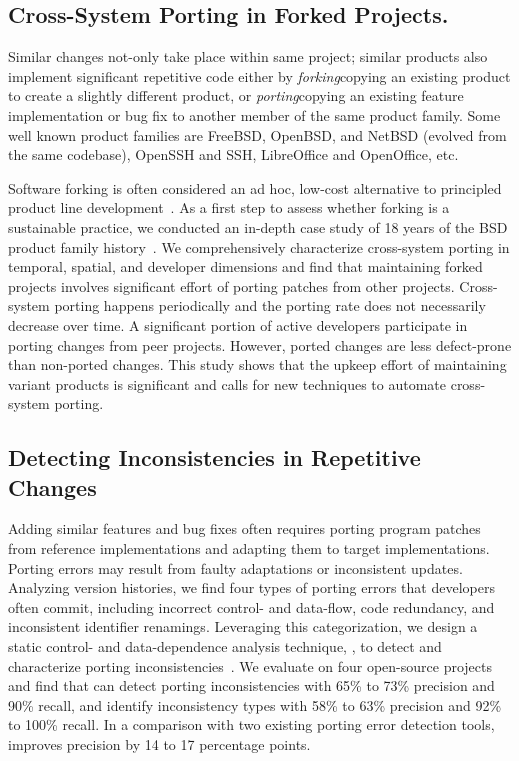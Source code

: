 \documentclass[a4paper, 11pt]{article}
\begin{document}
\begin{small}
\begin{itemize}
\end{itemize}

\subsection*{\small Cross-System Porting in Forked Projects.}

Similar changes not-only take place within same project; similar products also implement significant repetitive code 
either by {\it forking}\textemdash copying an existing product to create a slightly different product, or 
{\it porting}\textemdash copying an existing feature implementation or bug fix to another member of the same product family. 
Some well known product families are FreeBSD, OpenBSD, and NetBSD (evolved from the same codebase), 
OpenSSH and SSH, LibreOffice and OpenOffice, etc. 

Software forking is often considered an ad hoc, low-cost alternative to principled product line development~\cite{Raymond1999:CB}.
As a first step to assess whether forking is a sustainable practice, we conducted an in-depth case study of 18 years of the BSD product family 
history~\cite{Ray2012}. We comprehensively characterize cross-system porting in temporal, spatial, and developer dimensions and find that 
maintaining forked projects involves significant effort of porting patches from other projects. Cross-system porting happens periodically 
and the porting rate does not necessarily decrease over time. A significant portion of active developers participate in porting changes from peer projects. However, ported changes are less defect-prone than non-ported changes. This study shows that the upkeep effort of maintaining 
variant products is significant and calls for new techniques to automate cross-system porting. 

\subsection*{\small Detecting Inconsistencies in  Repetitive Changes}

Adding similar features and bug fixes often requires porting program patches from reference implementations and adapting them to target
implementations. Porting errors may result from faulty adaptations or inconsistent updates. 
Analyzing version histories, we find four types of porting errors that developers often commit, including incorrect control- and
data-flow, code redundancy, and inconsistent identifier renamings. Leveraging this categorization, we design a static control- and
data-dependence analysis technique, {\spa}, to detect and characterize porting inconsistencies~\cite{ray2013detecting}. 
We evaluate {\spa} on four open-source projects and find that {\spa} can detect porting inconsistencies with
65\% to 73\% precision and 90\% recall, and identify inconsistency types with 58\% to 63\% precision and 92\% to 100\% recall. 
In a comparison with two existing porting error detection tools, {\spa} improves precision by 14 to 17 percentage points.


\end{small}
\end{document}
